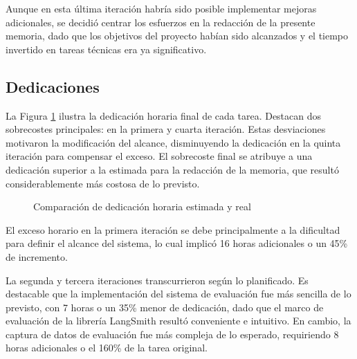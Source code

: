 Aunque en esta última iteración habría sido posible implementar mejoras adicionales, se decidió centrar los esfuerzos en la redacción de la presente memoria, dado que los objetivos del proyecto habían sido alcanzados y el tiempo invertido en tareas técnicas era ya significativo. 

\subsection{Dedicaciones}
La Figura \ref{fig:horas_real} ilustra la dedicación horaria final de cada tarea. Destacan dos sobrecostes principales: en la primera y cuarta iteración. Estas desviaciones motivaron la modificación del alcance, disminuyendo la dedicación en la quinta iteración para compensar el exceso. El sobrecoste final se atribuye a una dedicación superior a la estimada para la redacción de la memoria, que resultó considerablemente más costosa de lo previsto.

\begin{figure}[h]
\centering
{}
\caption{Comparación de dedicación horaria estimada y real}
\label{fig:horas_real}
\end{figure}

El exceso horario en la primera iteración se debe principalmente a la dificultad para definir el alcance del sistema, lo cual implicó 16 horas adicionales o un 45\% de incremento.

La segunda y tercera iteraciones transcurrieron según lo planificado. Es destacable que la implementación del sistema de evaluación fue más sencilla de lo previsto, con 7 horas o un 35\% menor de dedicación, dado que el marco de evaluación de la librería LangSmith resultó conveniente e intuitivo. En cambio, la captura de datos de evaluación fue más compleja de lo esperado, requiriendo 8 horas adicionales o el 160\% de la tarea original.

